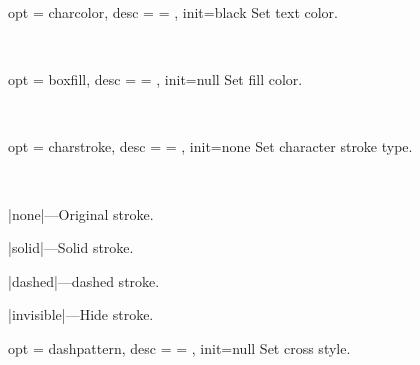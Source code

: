\documentclass[full]{l3doc}
\begin{document}
\begin{documentation}
\bigskip

\begin{option}{ opt = charcolor, desc = {= }, init=black }
  Set text color.
\end{option}\\
\begin{SideBySideExample}[frame=single,numbers=left,xrightmargin=.45\linewidth,gobble=2]
  \centering
  \quad
  \quad
\end{SideBySideExample}

\bigskip

\begin{option}{ opt = boxfill, desc = {= }, init=null }
  Set fill color.
\end{option}\\
\begin{SideBySideExample}[frame=single,numbers=left,xrightmargin=.45\linewidth,gobble=2]
  \centering
  \quad
  \quad
\end{SideBySideExample}

\bigskip

\begin{option}{ opt = charstroke, desc = {= }, init=none }
  Set character stroke type.
\end{option}\\
\begin{Description}
  \item |none|---Original stroke.
  \item |solid|---Solid stroke.
  \item |dashed|---dashed stroke.
  \item |invisible|---Hide stroke.
\end{Description}
\begin{SideBySideExample}[frame=single,numbers=left,xrightmargin=.45\linewidth,gobble=2]
  \centering
  \quad
  \quad
  \quad
\end{SideBySideExample}

\bigskip

\begin{option}{ opt = dashpattern, desc = {= }, init=null }
  Set cross style.
\end{option}\\
\begin{SideBySideExample}[frame=single,numbers=left,xrightmargin=.25\linewidth,gobble=2]
  \centering
  \quad
\end{SideBySideExample}

\end{documentation}
\end{document}
